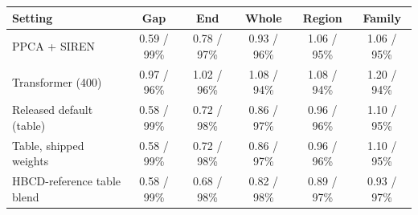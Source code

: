 \begin{tabular}{lccccc}
\toprule
Setting & Gap & End & Whole & Region & Family \\
\midrule
PPCA + SIREN & 0.59 / 99\% & 0.78 / 97\% & 0.93 / 96\% & 1.06 / 95\% & 1.06 / 95\% \\
Transformer (400) & 0.97 / 96\% & 1.02 / 96\% & 1.08 / 94\% & 1.08 / 94\% & 1.20 / 94\% \\
Released default (table) & 0.58 / 99\% & 0.72 / 98\% & 0.86 / 97\% & 0.96 / 96\% & 1.10 / 95\% \\
Table, shipped weights & 0.58 / 99\% & 0.72 / 98\% & 0.86 / 97\% & 0.96 / 96\% & 1.10 / 95\% \\
HBCD-reference table blend & 0.58 / 99\% & 0.68 / 98\% & 0.82 / 98\% & 0.89 / 97\% & 0.93 / 97\% \\
\bottomrule
\end{tabular}
